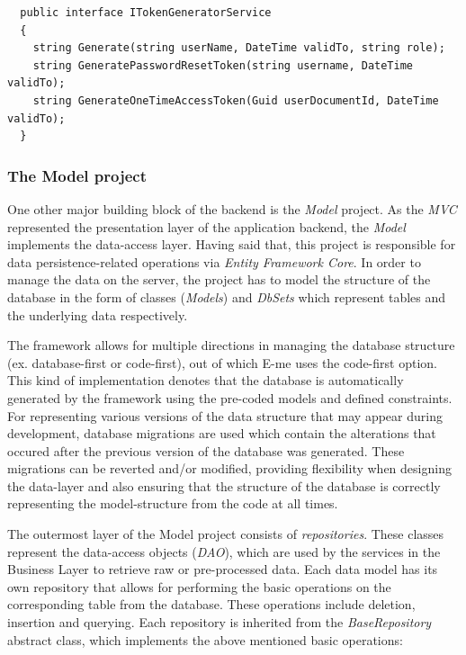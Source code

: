 \begin{lstlisting}
  public interface ITokenGeneratorService
  {
	string Generate(string userName, DateTime validTo, string role);
	string GeneratePasswordResetToken(string username, DateTime validTo);
	string GenerateOneTimeAccessToken(Guid userDocumentId, DateTime validTo);
  }
\end{lstlisting}

\subsubsection{The Model project}

One other major building block of the backend is the \emph{Model} project.
As the \emph{MVC} represented the presentation layer of the application backend, the \emph{Model} implements the data-access layer.
Having said that, this project is responsible for data persistence-related operations via \emph{Entity Framework Core}.
In order to manage the data on the server, the project has to model the structure of the database in the form of classes (\emph{Models}) and \emph{DbSets} which represent
tables and the underlying data respectively.

The framework allows for multiple directions in managing the database structure (ex. database-first or code-first), out of which E-me 
uses the code-first option.
This kind of implementation denotes that the database is automatically generated by the framework using the pre-coded models and defined constraints.
For representing various versions of the data structure that may appear during development, database migrations are used which contain the alterations
that occured after the previous version of the database was generated.
These migrations can be reverted and/or modified, providing flexibility when designing the data-layer and also ensuring that the structure of the database 
is correctly representing the model-structure from the code at all times.

The outermost layer of the Model project consists of \emph{repositories}.
These classes represent the data-access objects (\emph{DAO}), which are used by the services in the Business Layer to retrieve raw or pre-processed data.
Each data model has its own repository that allows for performing the basic operations on the corresponding table from the database.
These operations include deletion, insertion and querying.
Each repository is inherited from the \emph{BaseRepository} abstract class, which implements the above mentioned basic operations:

